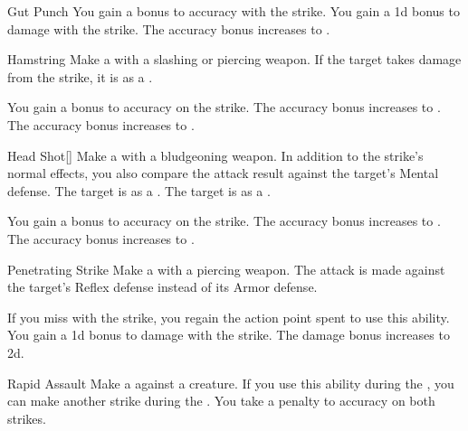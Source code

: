 {\begin{ability}{Gut Punch}
                \rankline
                 You gain a  bonus to accuracy with the strike.
                 You gain a \plus1d bonus to damage with the strike.
                 The accuracy bonus increases to .
            \end{ability}

            \begin{ability}{Hamstring}
                Make a  with a slashing or piercing weapon.
                If the target takes damage from the strike, it is  as a .

                \rankline
                 You gain a  bonus to accuracy on the strike.
                 The accuracy bonus increases to .
                 The accuracy bonus increases to .
            \end{ability}

            \begin{ability}{Head Shot}[]
                Make a  with a bludgeoning weapon.
                In addition to the strike's normal effects, you also compare the attack result against the target's Mental defense.
                \hit The target is  as a .
                \crit The target is  as a .

                \rankline
                 You gain a  bonus to accuracy on the strike.
                 The accuracy bonus increases to .
                 The accuracy bonus increases to .
            \end{ability}

            \begin{ability}{Penetrating Strike}
                Make a  with a piercing weapon.
                The attack is made against the target's Reflex defense instead of its Armor defense.

                \rankline
                 If you miss with the strike, you regain the action point spent to use this ability.
                 You gain a \plus1d bonus to damage with the strike.
                 The damage bonus increases to \plus2d.
            \end{ability}

            \begin{ability}{Rapid Assault}
                Make a  against a creature.
                If you use this ability during the , you can make another strike during the .
                You take a  penalty to accuracy on both strikes.


\end{ability}}
